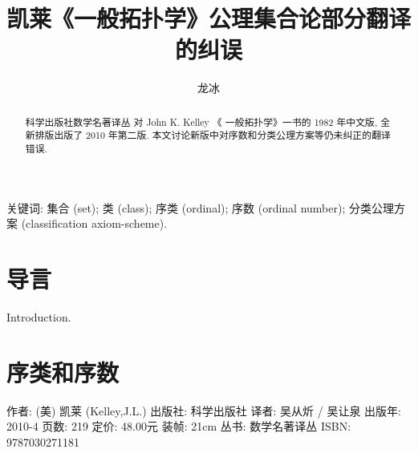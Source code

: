 \documentclass[zihao=-4,heading=true,a4paper]{ctexart}
\title{凯莱《一般拓扑学》公理集合论部分翻译的纠误}
\author{龙\quad 冰}
\date{}
\begin{document}
\maketitle
\begin{abstract}
科学出版社数学名著译丛 对 John K. Kelley 《 一般拓扑学》一书的 1982 年中文版, 全新排版出版了 2010 年第二版.
本文讨论新版中对序数和分类公理方案等仍未纠正的翻译错误.
\end{abstract}

关键词: 集合 (set); 类 (class); 序类 (ordinal); 
序数 (ordinal number); 
分类公理方案 (classification axiom-scheme).



\section{导言}
Introduction.

\section{序类和序数 }



作者: (美) 凯莱 (Kelley,J.L.)
出版社: 科学出版社
译者: 吴从炘 / 吴让泉 
出版年: 2010-4
页数: 219
定价: 48.00元
装帧: 21cm
丛书: 数学名著译丛
ISBN: 9787030271181
\end{document}
